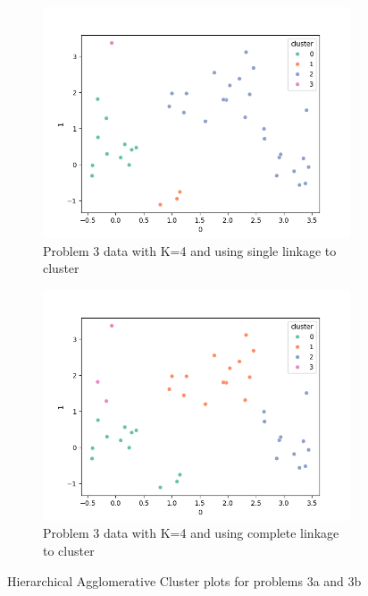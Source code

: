 \documentclass[12pt]{article}
\begin{document}
\begin{figure}
    \begin{subfigure}{0.5\textwidth}
        \centering
        \includegraphics[width=\linewidth]{../plots/single_linkage.png}
        \caption{Problem 3 data with K=4 and using single linkage to cluster}
        \label{fig:single_linkage}
    \end{subfigure}
    \begin{subfigure}{0.5\textwidth}
        \centering
        \includegraphics[width=\linewidth]{../plots/complete_linkage.png}
        \caption{Problem 3 data with K=4 and using complete linkage to cluster}
        \label{fig:complete_linkage}
    \end{subfigure}
    \caption{Hierarchical Agglomerative Cluster plots for problems 3a and 3b}\label{fig:3a}
\end{figure}
\end{document}
